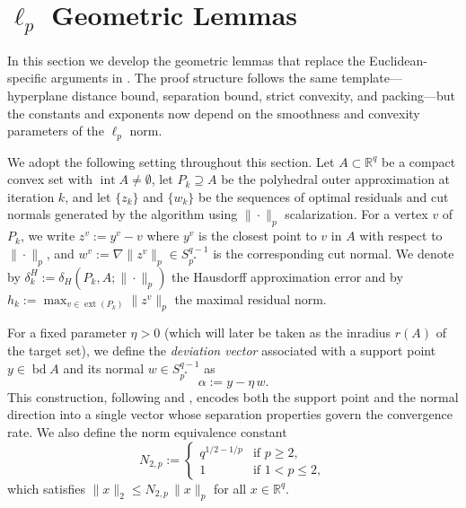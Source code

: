 \documentclass[11pt]{article}
\newcommand{\R}{\mathbb{R}}
\DeclareMathOperator{\ext}{ext}
\newcommand{\pstar}{p^*}
\begin{document}
\section{$\ell_p$ Geometric Lemmas}\label{sec:lp-lemmas}

In this section we develop the geometric lemmas that replace the Euclidean-specific arguments in \cite[Section~7]{Ararat2024}. The proof structure follows the same template---hyperplane distance bound, separation bound, strict convexity, and packing---but the constants and exponents now depend on the smoothness and convexity parameters of the $\ell_p$ norm.

We adopt the following setting throughout this section. Let $A \subset \R^q$ be a compact convex set with $\operatorname{int} A \neq \emptyset$, let $P_k \supseteq A$ be the polyhedral outer approximation at iteration $k$, and let $\{z_k\}$ and $\{w_k\}$ be the sequences of optimal residuals and cut normals generated by the algorithm using $\|\cdot\|_p$ scalarization. For a vertex $v$ of $P_k$, we write $z^v := y^v - v$ where $y^v$ is the closest point to $v$ in $A$ with respect to $\|\cdot\|_p$, and $w^v := \nabla \|z^v\|_p \in S_{\pstar}^{q-1}$ is the corresponding cut normal. We denote by $\delta^H_k := \delta_H(P_k, A; \|\cdot\|_p)$ the Hausdorff approximation error and by $h_k := \max_{v \in \ext(P_k)} \|z^v\|_p$ the maximal residual norm.

For a fixed parameter $\eta > 0$ (which will later be taken as the inradius $r(A)$ of the target set), we define the \emph{deviation vector} associated with a support point $y \in \operatorname{bd} A$ and its normal $w \in S_{\pstar}^{q-1}$ as
\begin{equation}\label{eq:deviation-vector}
\alpha := y - \eta \, w.
\end{equation}
This construction, following \cite[Section~7]{Ararat2024} and \cite[Chapter~8]{Lotov2004}, encodes both the support point and the normal direction into a single vector whose separation properties govern the convergence rate. We also define the norm equivalence constant
\begin{equation}\label{eq:norm-equiv}
N_{2,p} := \begin{cases} q^{1/2 - 1/p} & \text{if } p \ge 2, \\ 1 & \text{if } 1 < p \le 2, \end{cases}
\end{equation}
which satisfies $\|x\|_2 \le N_{2,p} \, \|x\|_p$ for all $x \in \R^q$.
\end{document}
